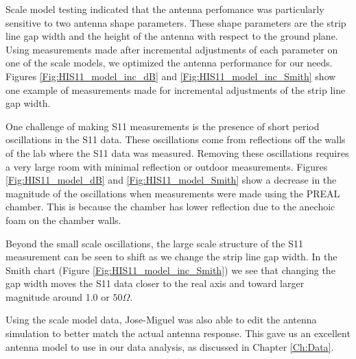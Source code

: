 Scale model testing indicated that the antenna perfomance was particularly sensitive to two antenna shape parameters. These shape parameters are the strip line gap width and the height of the antenna with respect to the ground plane. Using measurements made after incremental adjustments of each parameter on one of the scale models, we optimized the antenna performance for our needs. Figures \ref{Fig:HIS11_model_inc_dB} and \ref{Fig:HIS11_model_inc_Smith} show one example of measurements made for incremental adjustments of the strip line gap width. 

One challenge of making S11 measurements is the presence of short period oscillations in the S11 data. These oscillations come from reflections off the walls of the lab where the S11 data was measured. Removing these oscillations requires a very large room with minimal reflection or outdoor measurements. Figures \ref{Fig:HIS11_model_dB} and \ref{Fig:HIS11_model_Smith} show a decrease in the magnitude of the oscillations when measurements were made using the PREAL chamber. This is because the chamber has lower reflection due to the anechoic foam on the chamber walls. 

Beyond the small scale oscillations, the large scale structure of the S11 measurement can be seen to shift as we change the strip line gap width. In the Smith chart (Figure \ref{Fig:HIS11_model_inc_Smith}) we see that changing the gap width moves the S11 data closer to the real axis and toward larger magnitude around 1.0 or $50 \Omega$. 

Using the scale model data, Jose-Miguel was also able to edit the antenna simulation to better match the actual antenna response. This gave us an excellent antenna model to use in our data analysis, as discussed in Chapter \ref{Ch:Data}. 

